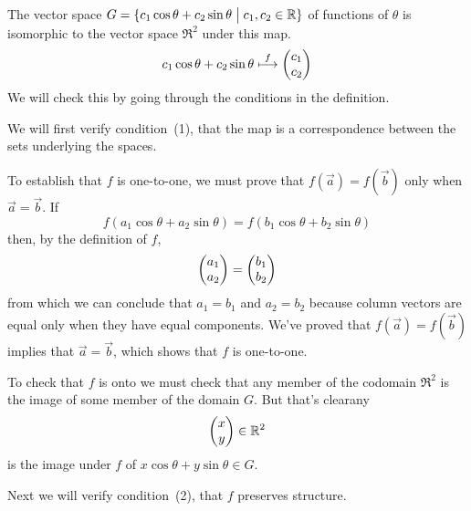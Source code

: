\begin{example}  \label{ex:CheckMapIsIso}
The vector space
\(  G=\mbox{$\{c_1\cos\theta+c_2\sin\theta\bigm| c_1,c_2\in\mathbb{R}\}$} \)
of functions of \( \theta \) is isomorphic to the vector space
\( \Re^2 \) under this map.
\begin{equation*}
  c_1\cos\theta+c_2\sin\theta\stackrel{f}{\longmapsto}\begin{pmatrix} c_1 \\ c_2 \end{pmatrix}
\end{equation*}
We will check this by going through the conditions in the definition.

We will first verify condition~(1), that the map is a 
correspondence between the sets underlying the spaces.

To establish that $f$ is one-to-one, 
we must prove that \( f(\vec{a})=f(\vec{b}) \) only when \( \vec{a}=\vec{b} \).
If
\begin{equation*}
   f(a_1\cos\theta+a_2\sin\theta)=f(b_1\cos\theta+b_2\sin\theta)
\end{equation*}
then, by the definition of $f$,
\begin{equation*}
  \begin{pmatrix} a_1 \\ a_2 \end{pmatrix}=\begin{pmatrix} b_1 \\ b_2 \end{pmatrix}
\end{equation*}
from which we can conclude that \( a_1=b_1 \) and \( a_2=b_2 \)
because column vectors are equal only when they have equal components.
We've proved that \( f(\vec{a})=f(\vec{b}) \) implies 
that \( \vec{a}=\vec{b} \),
which shows that \( f \) is one-to-one.

To check that $f$ is
onto we must check that any member of the codomain \( \Re^2 \)
is the image of some member of the domain $G$.
But that's clear\Dash any
\begin{equation*}
   \begin{pmatrix} x \\ y \end{pmatrix}\in \mathbb{R}^2
\end{equation*}
is the image under $f$ of \( x\cos\theta+y\sin\theta\in G \).

Next we will verify condition~(2), that $f$ preserves structure. 


\end{example}
